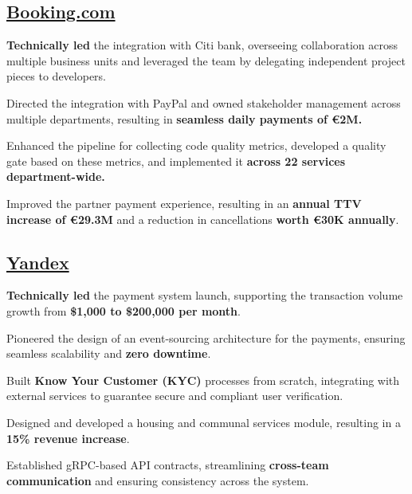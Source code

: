 \documentclass[letter,10pt]{article}
\begin{document}
\subsection{{\large\href{https://booking.com}{Booking.com}}}



\begin{zitemize}

\item \textbf{Technically led} the integration with Citi bank, overseeing collaboration across multiple business units and leveraged the team by delegating independent project pieces to developers.

\item Directed the integration with PayPal and owned stakeholder management across multiple departments, resulting in \textbf{seamless daily payments of \euro 2M.}

\item Enhanced the pipeline for collecting code quality metrics, developed a quality gate based on these metrics, and implemented it \textbf{across 22 services department-wide.}

\item Improved the partner payment experience, resulting in an \textbf{annual TTV increase of \euro 29.3M} and a reduction in cancellations \textbf{worth \euro 30K annually}.

\end{zitemize}

\subsection{{\large\href{https://yandex.com/}{Yandex}}}

\begin{zitemize}
\item \textbf{Technically led} the payment system launch, supporting the transaction volume growth from \textbf{\$1,000 to \$200,000 per month}.

\item  Pioneered the design of an event-sourcing architecture for the payments, ensuring seamless scalability and \textbf{zero downtime}.

\item  Built \textbf{Know Your Customer (KYC)} processes from scratch, integrating with external services to guarantee secure and compliant user verification.

\item  Designed and developed a housing and communal services module, resulting in a \textbf{15\% revenue increase}.

\item  Established gRPC-based API contracts, streamlining \textbf{cross-team communication} and ensuring consistency across the system.
\end{zitemize}
\end{document}

